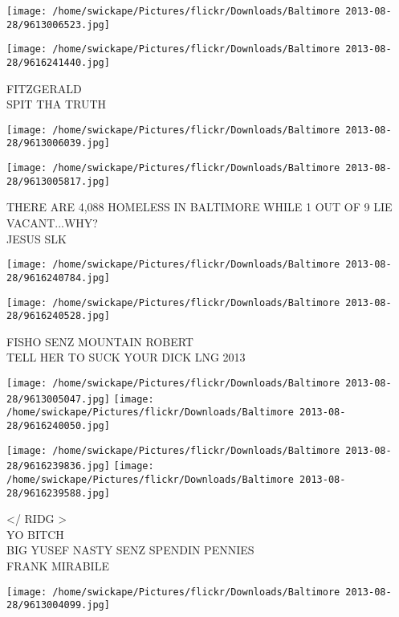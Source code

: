 \documentclass[10pt,letterpaper]{article}
\begin{document}
\texttt{[image: /home/swickape/Pictures/flickr/Downloads/Baltimore 2013-08-28/9613006523.jpg]}

\vspace{0.25in}
\texttt{[image: /home/swickape/Pictures/flickr/Downloads/Baltimore 2013-08-28/9616241440.jpg]}

FITZGERALD\\
SPIT THA TRUTH\\
\pagebreak

\texttt{[image: /home/swickape/Pictures/flickr/Downloads/Baltimore 2013-08-28/9613006039.jpg]}

\vspace{0.25in}
\texttt{[image: /home/swickape/Pictures/flickr/Downloads/Baltimore 2013-08-28/9613005817.jpg]}

THERE ARE 4,088 HOMELESS IN BALTIMORE WHILE 1 OUT OF 9 LIE VACANT...WHY?\\
JESUS SLK\\
\pagebreak

\texttt{[image: /home/swickape/Pictures/flickr/Downloads/Baltimore 2013-08-28/9616240784.jpg]}

\vspace{0.25in}
\texttt{[image: /home/swickape/Pictures/flickr/Downloads/Baltimore 2013-08-28/9616240528.jpg]}

FISHO SENZ MOUNTAIN ROBERT\\
TELL HER TO SUCK YOUR DICK LNG 2013\\
\pagebreak

\texttt{[image: /home/swickape/Pictures/flickr/Downloads/Baltimore 2013-08-28/9613005047.jpg]}
\texttt{[image: /home/swickape/Pictures/flickr/Downloads/Baltimore 2013-08-28/9616240050.jpg]}

\texttt{[image: /home/swickape/Pictures/flickr/Downloads/Baltimore 2013-08-28/9616239836.jpg]}
\texttt{[image: /home/swickape/Pictures/flickr/Downloads/Baltimore 2013-08-28/9616239588.jpg]}

</  RIDG >\\
YO BITCH\\
BIG YUSEF NASTY SENZ SPENDIN PENNIES\\
FRANK MIRABILE\\
\pagebreak

\texttt{[image: /home/swickape/Pictures/flickr/Downloads/Baltimore 2013-08-28/9613004099.jpg]}
\end{document}
